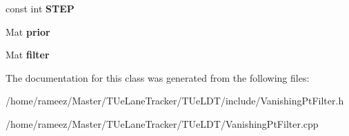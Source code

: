 \begin{DoxyCompactItemize}
\item 
\hypertarget{classVanishingPtFilter_a084eec87dd13ebbb5dfb4fdb7429a7bd}{const int {\bfseries S\-T\-E\-P}}\label{classVanishingPtFilter_a084eec87dd13ebbb5dfb4fdb7429a7bd}

\item 
\hypertarget{classVanishingPtFilter_abe37dbf0f29cc77268c7f9a2a1002e20}{Mat {\bfseries prior}}\label{classVanishingPtFilter_abe37dbf0f29cc77268c7f9a2a1002e20}

\item 
\hypertarget{classVanishingPtFilter_a6e143ceb334bb8a17af060d4c5fd7f16}{Mat {\bfseries filter}}\label{classVanishingPtFilter_a6e143ceb334bb8a17af060d4c5fd7f16}

\end{DoxyCompactItemize}


The documentation for this class was generated from the following files\-:\begin{DoxyCompactItemize}
\item 
/home/rameez/\-Master/\-T\-Ue\-Lane\-Tracker/\-T\-Ue\-L\-D\-T/include/Vanishing\-Pt\-Filter.\-h\item 
/home/rameez/\-Master/\-T\-Ue\-Lane\-Tracker/\-T\-Ue\-L\-D\-T/Vanishing\-Pt\-Filter.\-cpp\end{DoxyCompactItemize}
